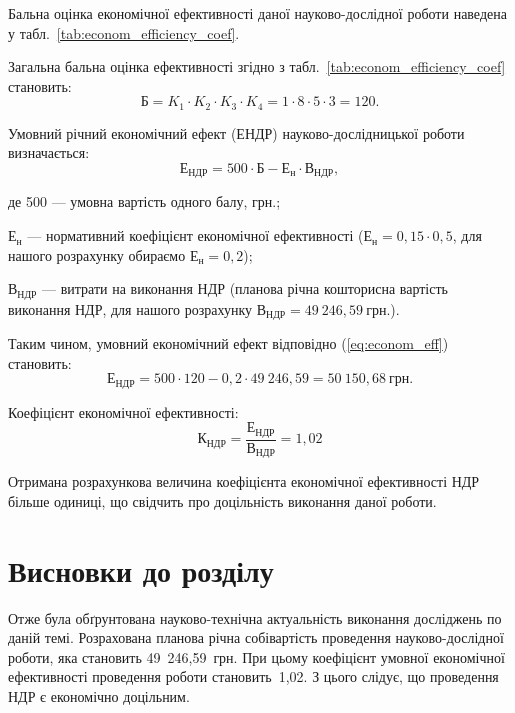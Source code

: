 \documentclass[a4paper,fontsize=14bp,ukrainian]{extreport}
\begin{document}
Бальна оцінка економічної ефективності даної науково-дослідної роботи наведена у табл.~\ref{tab:econom_efficiency_coef}.


\enlargethispage{1\baselineskip}
Загальна бальна оцінка ефективності згідно з табл.~\ref{tab:econom_efficiency_coef} становить:
\begin{equation*}
\text{Б} = K_1 \cdot K_2 \cdot K_3 \cdot K_4= 1 \cdot 8 \cdot 5 \cdot 3 = 120.
\end{equation*}

Умовний річний економічний ефект ($\text{ЕНДР}$) науково-дослідницької роботи визначається:
\begin{equation}
\text{Е}_{\text{НДР}} = 500 \cdot \text{Б} - \text{Е}_{\text{н}} \cdot \text{В}_{\text{НДР}},
\label{eq:econom_eff}
\end{equation}
\begin{eqitemize}
\item[де] 500 --- умовна вартість одного балу, грн.;
\item $\text{Е}_{\text{н}}$ --- нормативний коефіцієнт економічної ефективності ($\text{Е}_{\text{н}} = 0,15 \cdot 0,5$, для нашого розрахунку обираємо $\text{Е}_{\text{н}} = 0,2$);
\item $\text{В}_{\text{НДР}}$ --- витрати на виконання НДР (планова річна кошторисна вартість виконання НДР, для нашого розрахунку $\text{В}_{\text{НДР}}= 49~246,59~\text{грн}.$).
\end{eqitemize}

Таким чином, умовний економічний ефект відповідно (\ref{eq:econom_eff}) становить:
\begin{equation*}
\text{Е}_{\text{НДР}}=500 \cdot 120 - 0,2 \cdot 49~246,59 = 50~150,68~\text{грн}.
\end{equation*}

Коефіцієнт економічної ефективності:
\begin{equation*}
\text{К}_{\text{НДР}}= \frac{\text{Е}_{\text{НДР}}}{\text{В}_{\text{НДР}}}= 1,02
\end{equation*}

Отримана розрахункова величина коефіцієнта економічної ефективності НДР більше одиниці, що свідчить про доцільність виконання даної роботи.

\section{Висновки до розділу~\thechapter}

Отже була обґрунтована науково-технічна актуальність виконання досліджень по даній темі. Розрахована планова річна собівартість проведення науково-дослідної роботи, яка становить 49~246,59~грн. При цьому коефіцієнт умовної економічної ефективності проведення роботи становить~1,02. З цього слідує, що проведення НДР є економічно доцільним.
\end{document}
